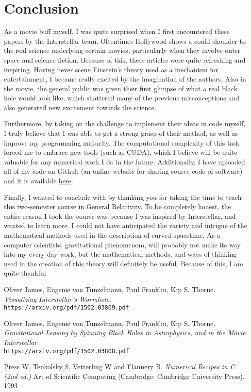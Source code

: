\documentclass{article}
\begin{document}
\section{Conclusion}
 \par As a movie buff myself, I was quite surprised when I first encountered these papers by the Interstellar team. Oftentimes Hollywood shows a could shoulder to the real science underlying certain movies, particularly when they involve outer space and science fiction. Because of this, these articles were quite refreshing and inspiring. Having never scene Einstein's theory used as a mechanism for entertainment, I became really excited by the imagination of the authors. Also in the movie, the general public was given their first glimpse of what a real black hole would look like, which shattered many of the previous misconceptions and also generated new excitement towards the science. \par
	Furthermore, by taking on the challenge to implement their ideas in code myself, I truly believe that I was able to get a strong grasp of their method, as well as improve my programming maturity. The computational complexity of this task forced me to embrace new tools (such as CUDA), which I believe will be quite valuable for any numerical work I do in the future. Additionally, I have uploaded all of my code on Github (an online website for sharing source code of software) and it is available \color{red}\href{https://github.com/Varcho/GeneralRelativity}{here}\color{black}.\par
	Finally, I wanted to conclude with by thanking you for taking the time to teach this two-semester course in General Relativity. To be completely honest, the entire reason I took the course was because I was inspired by Interstellar, and wanted to learn more. I could not have anticipated the variety and intrigue of the mathematical methods used in the description of curved spacetime. As a computer scientists, gravitational phenomenom, will probably not make its way into my every day work, but the mathematical methods, and ways of thinking used in the creation of this theory will definitely be useful. Because of this, I am quite thankful.
	


\begin{thebibliography}{9}
Oliver James, Eugenie von Tunzelmann, Paul Franklin, Kip S. Thorne. 
\textit{Visualizing Interstellar's Wormhole}. 
\\\texttt{https://arxiv.org/pdf/1502.03809.pdf}
 
Oliver James, Eugenie von Tunzelmann, Paul Franklin, Kip S. Thorne. 
\textit{Gravitational Lensing by Spinning Black Holes in Astrophysics, and in the Movie Interstellar}. 
\\\texttt{https://arxiv.org/pdf/1502.03808.pdf}
 
 
Press W, Teukolsky S, Vetterling W and Flannery B.
\textit{Numerical Recipes in C (2nd ed.)}
Art of Scientific Computing (Cambridge: Cambridge University Press), 1993
\end{thebibliography}
\end{document}
